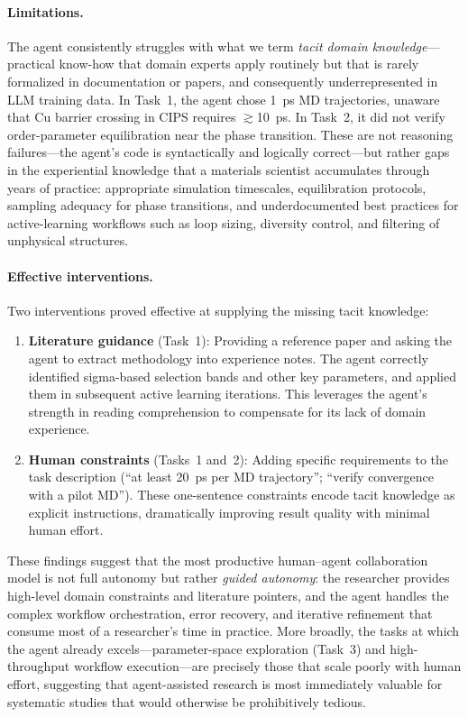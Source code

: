 \documentclass{article}
\begin{document}
\paragraph{Limitations.}
The agent consistently struggles with what we term \emph{tacit domain knowledge}---practical know-how that domain experts apply routinely but that is rarely formalized in documentation or papers, and consequently underrepresented in LLM training data.
In Task~1, the agent chose 1~ps MD trajectories, unaware that Cu barrier crossing in CIPS requires $\gtrsim$10~ps.
In Task~2, it did not verify order-parameter equilibration near the phase transition.
These are not reasoning failures---the agent's code is syntactically and logically correct---but rather gaps in the experiential knowledge that a materials scientist accumulates through years of practice: appropriate simulation timescales, equilibration protocols, sampling adequacy for phase transitions, and underdocumented best practices for active-learning workflows such as loop sizing, diversity control, and filtering of unphysical structures.

\paragraph{Effective interventions.}
Two interventions proved effective at supplying the missing tacit knowledge:
\begin{enumerate}
\item \textbf{Literature guidance} (Task~1): Providing a reference paper and asking the agent to extract methodology into experience notes. The agent correctly identified sigma-based selection bands and other key parameters, and applied them in subsequent active learning iterations. This leverages the agent's strength in reading comprehension to compensate for its lack of domain experience.
\item \textbf{Human constraints} (Tasks~1 and~2): Adding specific requirements to the task description (``at least 20~ps per MD trajectory''; ``verify convergence with a pilot MD''). These one-sentence constraints encode tacit knowledge as explicit instructions, dramatically improving result quality with minimal human effort.
\end{enumerate}

These findings suggest that the most productive human--agent collaboration model is not full autonomy but rather \emph{guided autonomy}: the researcher provides high-level domain constraints and literature pointers, and the agent handles the complex workflow orchestration, error recovery, and iterative refinement that consume most of a researcher's time in practice.
More broadly, the tasks at which the agent already excels---parameter-space exploration (Task~3) and high-throughput workflow execution---are precisely those that scale poorly with human effort, suggesting that agent-assisted research is most immediately valuable for systematic studies that would otherwise be prohibitively tedious.
\end{document}
